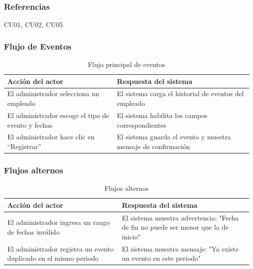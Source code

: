 \subsubsection*{Referencias}
CU01, CU02, CU05

\clearpage

\subsubsection*{Flujo de Eventos}
\begin{table}[h]
	\centering
	\caption{Flujo principal de eventos}
	\begin{tabular}{|p{7cm}|p{7cm}|}
		\hline
		\textbf{Acción del actor}                          & \textbf{Respuesta del sistema}                                \\ \hline
		El administrador selecciona un empleado            & El sistema carga el historial de eventos del empleado         \\ \hline
		El administrador escoge el tipo de evento y fechas & El sistema habilita los campos correspondientes               \\ \hline
		El administrador hace clic en “Registrar”          & El sistema guarda el evento y muestra mensaje de confirmación \\ \hline
	\end{tabular}
\end{table}

\subsubsection*{Flujos alternos}
\begin{table}[h]
	\centering
	\caption{Flujos alternos}
	\begin{tabular}{|p{7cm}|p{7cm}|}
		\hline
		\textbf{Acción del actor}                                         & \textbf{Respuesta del sistema}                                                     \\ \hline
		El administrador ingresa un rango de fechas inválido              & El sistema muestra advertencia: "Fecha de fin no puede ser menor que la de inicio" \\ \hline
		El administrador registra un evento duplicado en el mismo periodo & El sistema muestra mensaje: "Ya existe un evento en este periodo"                  \\ \hline
	\end{tabular}
\end{table}

